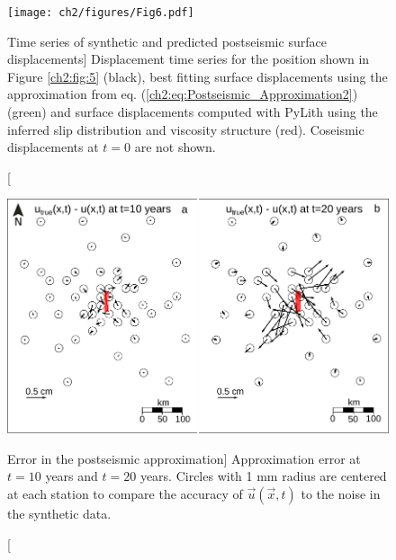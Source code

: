 \begin{figure}
\texttt{[image: ch2/figures/Fig6.pdf]}
\caption
[Time series of synthetic and predicted postseismic surface
displacements]
{Displacement time series for the position shown in Figure
\ref{ch2:fig:5} (black), best fitting surface displacements using the
approximation from eq. (\ref{ch2:eq:Postseismic_Approximation2})
(green) and surface displacements computed with PyLith using the
inferred slip distribution and viscosity structure (red). Coseismic
displacements at $t=0$ are not shown.}
\label{ch2:fig:6}
\end{figure}

\begin{figure}
\includegraphics{ch2/figures/Fig7.pdf}
\caption
[Error in the postseismic approximation]
{Approximation error at $t=10$ years and $t=20$ years. Circles
with 1 mm radius are centered at each station to compare the accuracy
of $\vec{u}(\vec{x},t)$ to the noise in the synthetic data.}
\label{ch2:fig:7}
\end{figure}

